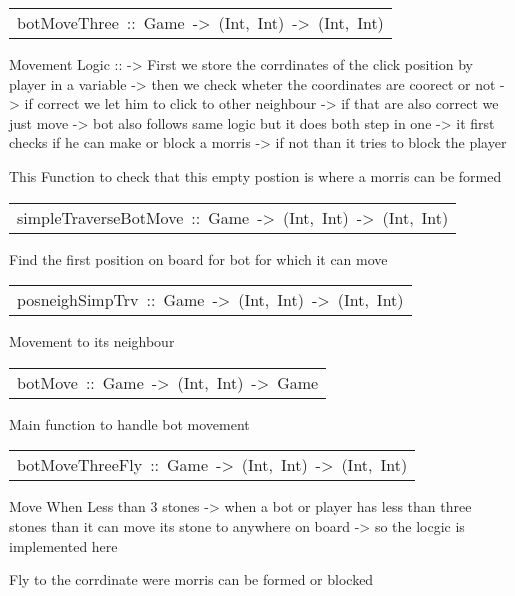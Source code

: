 \begin{haddockdesc}
\item[\begin{tabular}{@{}l}
botMoveThree\ ::\ Game\ ->\ (Int,\ Int)\ ->\ (Int,\ Int)
\end{tabular}]\haddockbegindoc
Movement Logic ::
 -> First we store the corrdinates of the click position by player in a variable
 -> then we check wheter the coordinates are coorect or not
 -> if correct we let him to click to other neighbour
 -> if that are also correct we just move
 -> bot also follows same logic but it does both step in one
 -> it first checks if he can make or block a morris
 -> if not than it tries to block the player\par
{}
  This Function  to check that this empty postion is where a morris can be formed\par

\end{haddockdesc}
\begin{haddockdesc}
\item[\begin{tabular}{@{}l}
simpleTraverseBotMove\ ::\ Game\ ->\ (Int,\ Int)\ ->\ (Int,\ Int)
\end{tabular}]\haddockbegindoc
{}
 Find the first position on board for bot for which it can move\par

\end{haddockdesc}
\begin{haddockdesc}
\item[\begin{tabular}{@{}l}
posneighSimpTrv\ ::\ Game\ ->\ (Int,\ Int)\ ->\ (Int,\ Int)
\end{tabular}]\haddockbegindoc
{}
 Movement to its neighbour\par

\end{haddockdesc}
\begin{haddockdesc}
\item[\begin{tabular}{@{}l}
botMove\ ::\ Game\ ->\ (Int,\ Int)\ ->\ Game
\end{tabular}]\haddockbegindoc
{}
 Main function to handle bot movement\par

\end{haddockdesc}
\begin{haddockdesc}
\item[\begin{tabular}{@{}l}
botMoveThreeFly\ ::\ Game\ ->\ (Int,\ Int)\ ->\ (Int,\ Int)
\end{tabular}]\haddockbegindoc
Move When Less than 3 stones
 -> when a bot or player has less than three stones than it can move its stone to anywhere on board
 -> so the locgic is implemented here\par
{}
 Fly to the corrdinate were morris can be formed or blocked\par

\end{haddockdesc}
